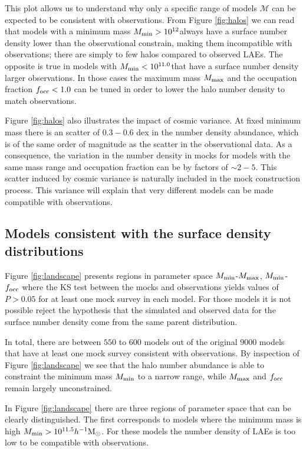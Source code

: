 \documentclass[usenatbib]{mn2e}
\newcommand{\hMsun}{{\ifmmode{h^{-1}{\rm
        {M_{\odot}}}}\else{$h^{-1}{\rm{M_{\odot}}}$}\fi}}
\begin{document}
This plot allows us to understand why only a specific range of
models ${\mathcal M}$ can be expected to be consistent with
observations. From Figure \ref{fig:halos} we can read that models with
a minimum mass $M_{\rm min}>10^{12}$\hMsun always have a
surface number density lower than the observational constrain, making
them incompatible with observations; there are simply to few halos compared to observed
LAEs. The opposite is true in models with $M_{\rm
  min}<10^{11.0}$\hMsun that have a surface number density larger
observations. In those cases the maximum mass $M_{\rm max}$ and the
occupation fraction $f_{\rm occ}<1.0$  can be tuned in order to lower
the halo number density to match observations.   


Figure \ref{fig:halos} also illustrates the impact of cosmic
variance. At fixed minimum mass there is an scatter of $0.3-0.6$ dex
in the number density abundance, which is of the same order of
magnitude as the scatter in the observational data.  As a consequence, the variation in
the number density in mocks for models with the same mass range and occupation
fraction can be by factors of $\sim 2-5$.  This scatter induced by
cosmic variance is naturally included in the mock construction
process. This variance will explain that very different models can be
made compatible with observations. 


\subsection{Models consistent with the surface density distributions}


Figure \ref{fig:landscape} presents regions in parameter space $M_{\rm
min}$-$M_{\rm max}$, $M_{\rm min}$-$f_{\rm occ}$ where the KS test
between the mocks and observations yields values of $P>0.05$ for at
least one mock survey in each model. For those models it
is not possible reject the hypothesis that the simulated and observed
data for the surface number density come from the same parent
distribution. 

In total, there are between $550$ to $600$ models out of the original
$9000$ models that have at least one mock survey consistent with
observations. By inspection of Figure \ref{fig:landscape} we see that
the halo number abundance is able to constraint the minimum mass
$M_{\rm min}$ to a narrow range, while $M_{\rm max}$ and $f_{\rm occ}$
remain largely unconstrained. 

In Figure \ref{fig:landscape} there are three regions of parameter
space that can be clearly distinguished. The first corresponds to
models where the minimum mass is high $M_{\rm min}>
10^{11.5}\hMsun$.  For these models the number density of LAEs is too low
to be compatible with observations. 
\end{document}
